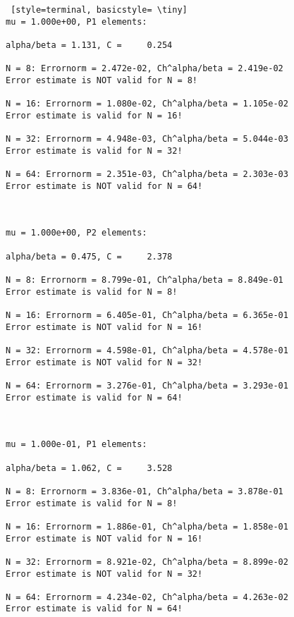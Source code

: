 \documentclass[a4paper,english,12pt,twoside]{article}
\begin{document}
\begin{lstlisting} [style=terminal, basicstyle= \tiny]
mu = 1.000e+00, P1 elements:

alpha/beta = 1.131, C =     0.254

N = 8: Errornorm = 2.472e-02, Ch^alpha/beta = 2.419e-02
Error estimate is NOT valid for N = 8!

N = 16: Errornorm = 1.080e-02, Ch^alpha/beta = 1.105e-02
Error estimate is valid for N = 16!

N = 32: Errornorm = 4.948e-03, Ch^alpha/beta = 5.044e-03
Error estimate is valid for N = 32!

N = 64: Errornorm = 2.351e-03, Ch^alpha/beta = 2.303e-03
Error estimate is NOT valid for N = 64!



mu = 1.000e+00, P2 elements:

alpha/beta = 0.475, C =     2.378

N = 8: Errornorm = 8.799e-01, Ch^alpha/beta = 8.849e-01
Error estimate is valid for N = 8!

N = 16: Errornorm = 6.405e-01, Ch^alpha/beta = 6.365e-01
Error estimate is NOT valid for N = 16!

N = 32: Errornorm = 4.598e-01, Ch^alpha/beta = 4.578e-01
Error estimate is NOT valid for N = 32!

N = 64: Errornorm = 3.276e-01, Ch^alpha/beta = 3.293e-01
Error estimate is valid for N = 64!



mu = 1.000e-01, P1 elements:

alpha/beta = 1.062, C =     3.528

N = 8: Errornorm = 3.836e-01, Ch^alpha/beta = 3.878e-01
Error estimate is valid for N = 8!

N = 16: Errornorm = 1.886e-01, Ch^alpha/beta = 1.858e-01
Error estimate is NOT valid for N = 16!

N = 32: Errornorm = 8.921e-02, Ch^alpha/beta = 8.899e-02
Error estimate is NOT valid for N = 32!

N = 64: Errornorm = 4.234e-02, Ch^alpha/beta = 4.263e-02
Error estimate is valid for N = 64!

\end{lstlisting}
\newpage
\end{document}
